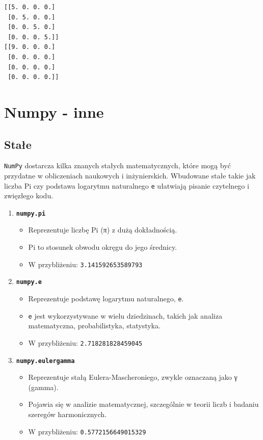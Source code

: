 \documentclass[
  letterpaper,
  DIV=11,
  numbers=noendperiod]{scrreprt}
\providecommand{\tightlist}{%
  \setlength{\itemsep}{0pt}\setlength{\parskip}{0pt}}\usepackage{longtable,booktabs,array}
\begin{document}
\begin{verbatim}
[[5. 0. 0. 0.]
 [0. 5. 0. 0.]
 [0. 0. 5. 0.]
 [0. 0. 0. 5.]]
[[9. 0. 0. 0.]
 [0. 0. 0. 0.]
 [0. 0. 0. 0.]
 [0. 0. 0. 0.]]
\end{verbatim}

\chapter{Numpy - inne}\label{numpy---inne}

\section{Stałe}\label{staux142e}

\texttt{NumPy} dostarcza kilka znanych stałych matematycznych, które
mogą być przydatne w obliczeniach naukowych i inżynierskich. Wbudowane
stałe takie jak liczba Pi czy podstawa logarytmu naturalnego \texttt{e}
ułatwiają pisanie czytelnego i zwięzłego kodu.

\begin{enumerate}
\def\labelenumi{\arabic{enumi}.}
\tightlist
\item
  \textbf{\texttt{numpy.pi}}

  \begin{itemize}
  \tightlist
  \item
    Reprezentuje liczbę Pi (π) z dużą dokładnością.\\
  \item
    Pi to stosunek obwodu okręgu do jego średnicy.\\
  \item
    W przybliżeniu: \texttt{3.141592653589793}
  \end{itemize}
\item
  \textbf{\texttt{numpy.e}}

  \begin{itemize}
  \tightlist
  \item
    Reprezentuje podstawę logarytmu naturalnego, \texttt{e}.\\
  \item
    \texttt{e} jest wykorzystywane w wielu dziedzinach, takich jak
    analiza matematyczna, probabilistyka, statystyka.\\
  \item
    W przybliżeniu: \texttt{2.718281828459045}
  \end{itemize}
\item
  \textbf{\texttt{numpy.eulergamma}}

  \begin{itemize}
  \tightlist
  \item
    Reprezentuje stałą Eulera-Mascheroniego, zwykle oznaczaną jako γ
    (gamma).
  \item
    Pojawia się w analizie matematycznej, szczególnie w teorii liczb i
    badaniu szeregów harmonicznych.
  \item
    W przybliżeniu: \texttt{0.5772156649015329}
  \end{itemize}
\end{enumerate}
\end{document}
